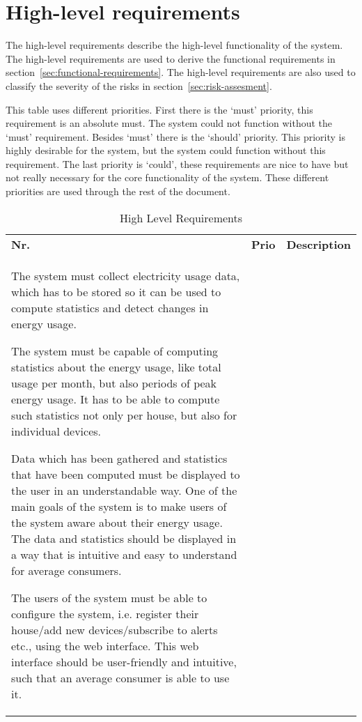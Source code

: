 
\clearpage
\section{High-level requirements}
The high-level requirements describe the high-level functionality of the system. The high-level requirements are used to derive the functional requirements in section~\ref{sec:functional-requirements}. The high-level requirements are also used to classify the severity of the risks in section~\ref{sec:risk-assesment}. 

This table uses different priorities. First there is the `must' priority, this requirement is an absolute must. The system could not function without the `must' requirement. Besides `must' there is the `should' priority. This priority is highly desirable for the system, but the system could function without this requirement. The last priority is `could', these requirements are nice to have but not really necessary for the core functionality of the system. These different priorities are used through the rest of the document.

\begin{longtable}{L{0.1\textwidth} L{0.12\textwidth} L{0.78\textwidth}}
	\textbf{Nr.} & \textbf{Prio} & \textbf{Description} \\
		
	{ The system must collect electricity usage data, which has to be stored so it can be used to compute statistics and detect changes in energy usage. }
	
	{ The system must be capable of computing statistics about the energy usage, like total usage per month, but also periods of peak energy usage. It has to be able to compute such statistics not only per house, but also for individual devices. }
	
	{ Data which has been gathered and statistics that have been computed must be displayed to the user in an understandable way. One of the main goals of the system is to make users of the system aware about their energy usage. The data and statistics should be displayed in a way that is intuitive and easy to understand for average consumers. }
	
	{ The users of the system must be able to configure the system, i.e. register their house/add new devices/subscribe to alerts etc., using the web interface. This web interface should be user-friendly and intuitive, such that an average consumer is able to use it. }
			    
	\bottomrule

\caption{High Level Requirements}
\label{table:high-level-requirements}	    
\end{longtable}

